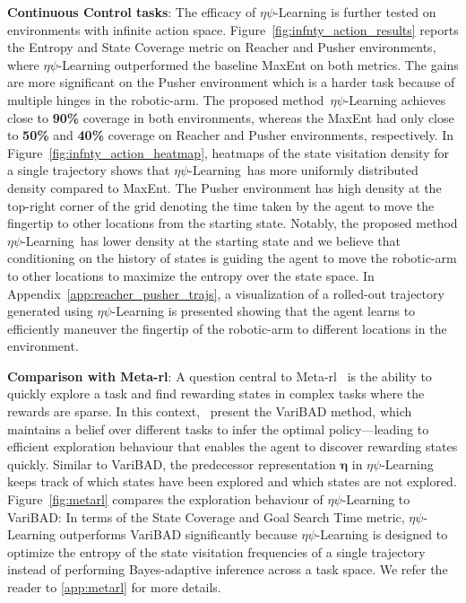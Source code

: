 \documentclass{article}
\theoremstyle{plain}
\theoremstyle{definition}
\theoremstyle{remark}
\newcommand{\alg}{$\eta$$\psi$-Learning}
\begin{document}
\textbf{Continuous Control tasks}: 
The efficacy of \alg{} is further tested on environments with infinite action space. Figure~\ref{fig:infnty_action_results} reports the Entropy and State Coverage metric on Reacher and Pusher environments, where \alg{} outperformed the baseline MaxEnt on both metrics.
The gains are more significant on the Pusher environment which is a harder task because of multiple hinges in the robotic-arm.
The proposed method~\alg{} achieves close to \textbf{90\%} coverage in both environments, whereas the MaxEnt had only close to \textbf{50\%} and \textbf{40\%} coverage on Reacher and Pusher environments, respectively.
In Figure~\ref{fig:infnty_action_heatmap}, heatmaps of the state visitation density for a single trajectory shows that \alg{}~has more uniformly distributed density compared to MaxEnt.
The Pusher environment has high density at the top-right corner of the grid denoting the time taken by the agent to move the fingertip to other locations from the starting state. 
Notably, the proposed method \alg{}~has lower density at the starting state and we believe that conditioning on the history of states is guiding the agent to move the robotic-arm to other locations to maximize the entropy over the state space.
In Appendix~\ref{app:reacher_pusher_trajs}, a visualization of a rolled-out trajectory generated using \alg{} is presented showing that the agent learns to efficiently maneuver the fingertip of the robotic-arm to different locations in the environment.

\textbf{Comparison with Meta-\gls{rl}}:
A question central to Meta-\gls{rl}~\cite{finn2017model,zintgraf2019varibad,liu2021decoupling} is the ability to quickly explore a task and find rewarding states in complex tasks where the rewards are sparse.
In this context,~\citet{zintgraf2019varibad} present the VariBAD method, which maintains a belief over different tasks to infer the optimal policy---leading to efficient exploration behaviour that enables the agent to discover rewarding states quickly.
Similar to VariBAD, the predecessor representation $\pmb{\eta}$ in \alg{} keeps track of which states have been explored and which states are not explored.
Figure~\ref{fig:metarl} compares the exploration behaviour of \alg{} to VariBAD:
In terms of the State Coverage and Goal Search Time metric, \alg{} outperforms VariBAD significantly because \alg{} is designed to optimize the entropy of the state visitation frequencies of a single trajectory instead of performing Bayes-adaptive inference across a task space.
We refer the reader to \autoref{app:metarl} for more details. 
\end{document}
